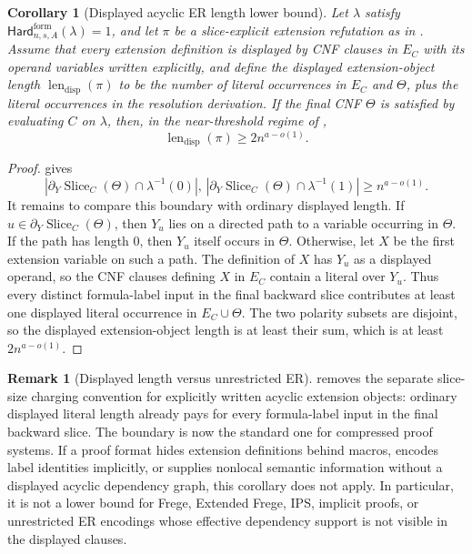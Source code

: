 \documentclass[11pt]{article}
\newtheorem{corollary}[theorem]{Corollary}
\theoremstyle{definition}
\newtheorem{remark}[theorem]{Remark}
\newcommand{\HardF}{\mathsf{Hard}^{\mathrm{form}}}
\begin{document}
\begin{corollary}[Displayed acyclic ER length lower bound]\label{cor:displayed-er-length}
Let \(\lambda\) satisfy \(\HardF_{n,s,A}(\lambda)=1\), and let \(\pi\) be a slice-explicit extension refutation as in .  Assume that every extension definition is displayed by CNF clauses in \(E_C\) with its operand variables written explicitly, and define the displayed extension-object length \(\operatorname{len}_{\mathrm{disp}}(\pi)\) to be the number of literal occurrences in \(E_C\) and \(\Theta\), plus the literal occurrences in the resolution derivation.  If the final CNF \(\Theta\) is satisfied by evaluating \(C\) on \(\lambda\), then, in the near-threshold regime of ,
\[
  \operatorname{len}_{\mathrm{disp}}(\pi)\ge 2n^{a-o(1)}.
\]
\end{corollary}

\begin{proof}
 gives
\[
  |\partial_Y\operatorname{Slice}_C(\Theta)\cap\lambda^{-1}(0)|,\,
  |\partial_Y\operatorname{Slice}_C(\Theta)\cap\lambda^{-1}(1)|
  \ge n^{a-o(1)}.
\]
It remains to compare this boundary with ordinary displayed length.  If \(u\in\partial_Y\operatorname{Slice}_C(\Theta)\), then \(Y_u\) lies on a directed path to a variable occurring in \(\Theta\).  If the path has length \(0\), then \(Y_u\) itself occurs in \(\Theta\).  Otherwise, let \(X\) be the first extension variable on such a path.  The definition of \(X\) has \(Y_u\) as a displayed operand, so the CNF clauses defining \(X\) in \(E_C\) contain a literal over \(Y_u\).  Thus every distinct formula-label input in the final backward slice contributes at least one displayed literal occurrence in \(E_C\cup\Theta\).  The two polarity subsets are disjoint, so the displayed extension-object length is at least their sum, which is at least \(2n^{a-o(1)}\).
\end{proof}

\begin{remark}[Displayed length versus unrestricted ER]\label{rem:displayed-er-length-scope}
 removes the separate slice-size charging convention for explicitly written acyclic extension objects: ordinary displayed literal length already pays for every formula-label input in the final backward slice.  The boundary is now the standard one for compressed proof systems.  If a proof format hides extension definitions behind macros, encodes label identities implicitly, or supplies nonlocal semantic information without a displayed acyclic dependency graph, this corollary does not apply.  In particular, it is not a lower bound for Frege, Extended Frege, IPS, implicit proofs, or unrestricted ER encodings whose effective dependency support is not visible in the displayed clauses.
\end{remark}
\end{document}
